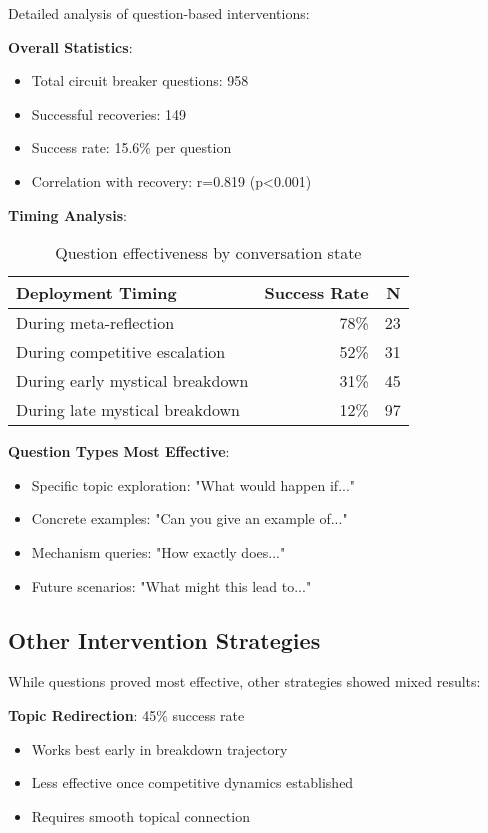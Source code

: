\documentclass[11pt,letterpaper]{article}
\newcommand{\exponedataQuestionCorrelation}{0.819}
\newcommand{\exponedataQuestionPValue}{p\textless0.001}
\newcommand{\exponedataTotalQuestions}{958}
\newcommand{\exponedataTotalRecoveries}{149}
\newcommand{\exponedataQuestionSuccessRate}{15.6\%}
\begin{document}
Detailed analysis of question-based interventions:

\textbf{Overall Statistics}:
\begin{itemize}
    \item Total circuit breaker questions: \exponedataTotalQuestions{}
    \item Successful recoveries: \exponedataTotalRecoveries{}
    \item Success rate: \exponedataQuestionSuccessRate{} per question
    \item Correlation with recovery: r=\exponedataQuestionCorrelation{} (\exponedataQuestionPValue{})
\end{itemize}

\textbf{Timing Analysis}:
\begin{table}[h]
\centering
\begin{tabular}{lrr}
\toprule
\textbf{Deployment Timing} & \textbf{Success Rate} & \textbf{N} \\
\midrule
During meta-reflection & 78\% & 23 \\
During competitive escalation & 52\% & 31 \\
During early mystical breakdown & 31\% & 45 \\
During late mystical breakdown & 12\% & 97 \\
\bottomrule
\end{tabular}
\caption{Question effectiveness by conversation state}
\label{tab:question_timing}
\end{table}

\textbf{Question Types Most Effective}:
\begin{itemize}
    \item Specific topic exploration: "What would happen if..."
    \item Concrete examples: "Can you give an example of..."
    \item Mechanism queries: "How exactly does..."
    \item Future scenarios: "What might this lead to..."
\end{itemize}

\subsection{Other Intervention Strategies}

While questions proved most effective, other strategies showed mixed results:

\textbf{Topic Redirection}: 45\% success rate
\begin{itemize}
    \item Works best early in breakdown trajectory
    \item Less effective once competitive dynamics established
    \item Requires smooth topical connection
\end{itemize}
\end{document}
